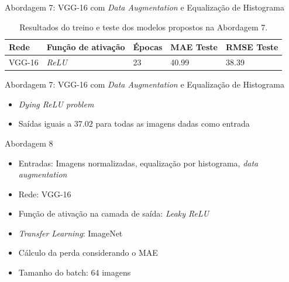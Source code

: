 \begin{frame}{Abordagem 7: VGG-16 com \emph{Data Augmentation} e Equalização de Histograma}
  \begin{table}[!ht]
  	\centering
  	\caption{Resultados do treino e teste dos modelos propostos na Abordagem 7.}
  	\label{tab:results-7}
  		\begin{tabular}{l l l l l }
  			\toprule
  			Rede & Função de ativação & Épocas & MAE Teste & RMSE Teste \\
  			\midrule
  			VGG-16 & \emph{ReLU} & 23 & 40.99 & 38.39 \\
  			\bottomrule
  		\end{tabular}
  	\end{table}
\end{frame}

\begin{frame}{Abordagem 7: VGG-16 com \emph{Data Augmentation} e Equalização de Histograma}
  \begin{itemize}
    \item \emph{Dying ReLU problem}
    \item Saídas iguais a $37.02$ para todas as imagens dadas como entrada
  \end{itemize}
\end{frame}



\begin{frame}{Abordagem 8}
 \begin{itemize}
   \item Entradas: Imagens normalizadas, equalização por histograma, \emph{data augmentation}
   \item Rede: VGG-16
   \item Função de ativação na camada de saída: \alert{\emph{Leaky ReLU}}
   \item \alert{\emph{Transfer Learning}: ImageNet}
   \ \ \newline
   \item Cálculo da perda considerando o MAE
   \item Tamanho do batch: 64 imagens
   \end{itemize}
\end{frame}

